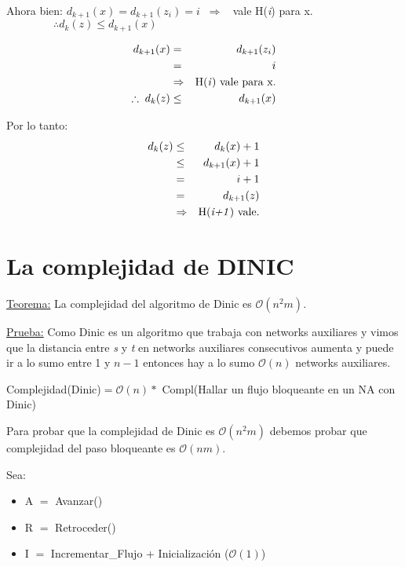 \documentclass[12pt,a4paper]{report}
\begin{document}
\begin{enumerate}
			Ahora bien: \qquad $d_{k+1}(x) = d_{k+1}(z_{i}) = i \; \; \Rightarrow \; \;$ vale H(\textit{i}) para x. \\
			$ \; \qquad \qquad \therefore d_{k}(z) \leq d_{k+1}(x)$

			\begin{eqnarray}
					\nonumber d_{k+1}(x) & = & d_{k+1}(z_{i}) \\
					\nonumber & = & i \\
					\nonumber & \Rightarrow & \textup{H(\textit{i}) vale para x.} \\
					\nonumber \therefore \; d_{k}(z) & \leq & d_{k+1}(x)
				\end{eqnarray}

			Por lo tanto:
			\begin{eqnarray}
					\nonumber d_{k}(z) & \leq & d_{k}(x) + 1 \\
					\nonumber & \leq & d_{k+1}(x) + 1 \\
					\nonumber & = & i+1 \\
					\nonumber & = & d_{k+1}(z) \\
					\nonumber & \Rightarrow & \textup{H(\textit{i+1}) vale.}
				\end{eqnarray}
		\end{enumerate}


	\section{La complejidad de DINIC}

		\underline{Teorema:} La complejidad del algoritmo de Dinic es $\mathcal{O}(n^{2}m)$.

		\underline{Prueba:} Como Dinic es un algoritmo que trabaja con networks auxiliares y vimos que la distancia entre \textit{s} y \textit{t} en networks auxiliares consecutivos aumenta y puede ir a lo sumo entre 1 y $n-1$ entonces hay a lo sumo $\mathcal{O}(n)$ networks auxiliares.

		\begin{center}
			Complejidad(Dinic)$ = \mathcal{O}(n) *$ Compl(Hallar un flujo bloqueante en un NA con Dinic)
		\end{center}

		Para probar que la complejidad de Dinic es $\mathcal{O}(n^{2}m)$ debemos probar que complejidad del paso bloqueante es $\mathcal{O}(nm)$.

		Sea:
		\begin{itemize}
			\item A $=$ Avanzar()
			\item R $=$ Retroceder()
			\item I $=$ Incrementar\_Flujo + Inicialización ($\mathcal{O}(1)$)
		\end{itemize}
\end{document}
